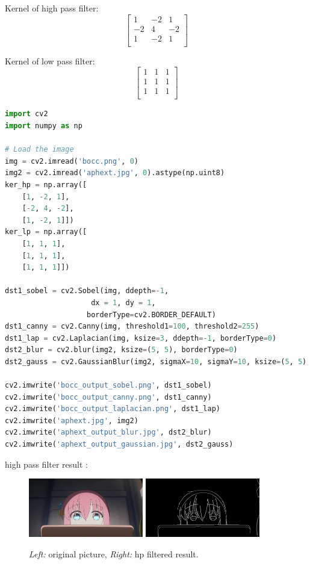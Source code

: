	Kernel of high pass filter:
	\[
	\begin{bmatrix}
	    1 & -2 & 1 \\
	    -2 & 4  & -2 \\
	    1 & -2 & 1 \\
	\end{bmatrix}
	\]
	
	Kernel of low pass filter:
	\[
	\begin{bmatrix}
	    1 & 1 & 1 \\
	    1 & 1 & 1 \\
	    1 & 1 & 1 \\
	\end{bmatrix}
	\]

	\begin{lstlisting}[language=Python]
import cv2
import numpy as np

# Load the image
img = cv2.imread('bocc.png', 0)
img2 = cv2.imread('aphext.jpg', 0).astype(np.uint8)
ker_hp = np.array([
    [1, -2, 1],
    [-2, 4, -2],
    [1, -2, 1]])
ker_lp = np.array([
    [1, 1, 1],
    [1, 1, 1],
    [1, 1, 1]])

dst1_sobel = cv2.Sobel(img, ddepth=-1,
                    dx = 1, dy = 1,
                   borderType=cv2.BORDER_DEFAULT)
dst1_canny = cv2.Canny(img, threshold1=100, threshold2=255)
dst1_lap = cv2.Laplacian(img, ksize=3, ddepth=-1, borderType=0)
dst2_blur = cv2.blur(img2, ksize=(5, 5), borderType=0)
dst2_gauss = cv2.GaussianBlur(img2, sigmaX=10, sigmaY=10, ksize=(5, 5), borderType=0)

cv2.imwrite('bocc_output_sobel.png', dst1_sobel)
cv2.imwrite('bocc_output_canny.png', dst1_canny)
cv2.imwrite('bocc_output_laplacian.png', dst1_lap)
cv2.imwrite('aphext.jpg', img2)
cv2.imwrite('aphext_output_blur.jpg', dst2_blur)
cv2.imwrite('aphext_output_gaussian.jpg', dst2_gauss)
	\end{lstlisting}

	high pass filter result : 
	\begin{figure}[h!]
	    \centering
	    \includegraphics[width=5cm]{bocc.png}
	    \includegraphics[width=5cm]{bocc_output_canny.png}
	    \caption{\emph{Left:} original picture, \emph{Right:} hp filtered result.}
	    \label{fig:result2}
	\end{figure}
	
